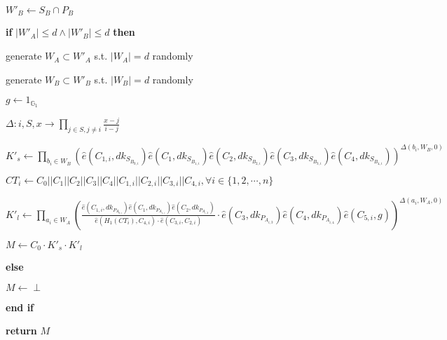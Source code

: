 \documentclass[a4paper]{article}
\begin{document}
$W'_B \gets S_B \cap P_B$

\textbf{if} $|W'_A| \leqslant d \land |W'_B| \leqslant d$ \textbf{then}

	\quad generate $W_A \subset W'_A$ s.t. $|W_A| = d$ randomly

	\quad generate $W_B \subset W'_B$ s.t. $|W_B| = d$ randomly

	\quad$g \gets 1_{\mathbb{G}_1}$

	\quad$\Delta: i, S, x \rightarrow \prod\limits_{j \in S, j \neq i} \frac{x - j}{i - j}$

	\quad$K'_s \gets \prod\limits_{b_i \in W_B} (\hat{e}(C_{1, i}, \textit{dk}_{S_{B_{0, i}}}) \hat{e}(C_1, \textit{dk}_{S_{B_{1, i}}}) \hat{e}(C_2, \textit{dk}_{S_{B_{2, i}}}) \hat{e}(C_3, \textit{dk}_{S_{B_{3, i}}}) \hat{e}(C_4, \textit{dk}_{S_{B_{4, i}}}))^{\Delta(b_i, W_B, 0)}$

	\quad$\textit{CT}_i \gets C_0 || C_1 || C_2 || C_3 || C_4 || C_{1, i} || C_{2, i} || C_{3, i} || C_{4, i}, \forall i \in \{1, 2, \cdots, n\}$

	\quad$K'_l \gets \prod\limits_{a_i \in W_A} \left(\frac{\hat{e}(C_{1, i}, \textit{dk}_{P_{A_{0, i}}}) \hat{e}(C_1, \textit{dk}_{P_{A_{1, i}}}) \hat{e}(C_2, \textit{dk}_{P_{A_{i, 2}}})}{\hat{e}(H_1(\textit{CT}_i), C_{4, i}) \cdot \hat{e}(C_{3, i}, C_{2, i})} \cdot \hat{e}(C_3, \textit{dk}_{P_{A_{i, 3}}}) \hat{e}(C_4, \textit{dk}_{P_{A_{i, 4}}}) \hat{e}(C_{5, i}, g)\right)^{\Delta(a_i, W_A, 0)}$

	\quad$M \gets C_0 \cdot K'_s \cdot K'_l$

\textbf{else}

	\quad$M \gets \perp$

\textbf{end if}

\textbf{return} $M$
\end{document}
